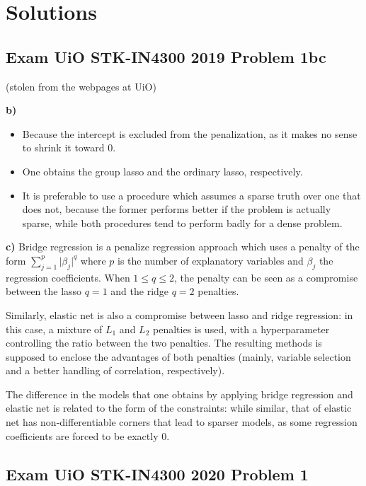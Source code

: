 \documentclass[
  letterpaper,
  DIV=11,
  numbers=noendperiod]{scrartcl}
\providecommand{\tightlist}{%
  \setlength{\itemsep}{0pt}\setlength{\parskip}{0pt}}\usepackage{longtable,booktabs,array}
\begin{document}
\hypertarget{solutions}{%
\section{Solutions}\label{solutions}}

\hypertarget{exam-uio-stk-in4300-2019-problem-1bc}{%
\subsection{Exam UiO STK-IN4300 2019 Problem
1bc}\label{exam-uio-stk-in4300-2019-problem-1bc}}

(stolen from the webpages at UiO)

\textbf{b)}

\begin{itemize}
\tightlist
\item
  Because the intercept is excluded from the penalization, as it makes
  no sense to shrink it toward 0.
\item
  One obtains the group lasso and the ordinary lasso, respectively.
\item
  It is preferable to use a procedure which assumes a sparse truth over
  one that does not, because the former performs better if the problem
  is actually sparse, while both procedures tend to perform badly for a
  dense problem.
\end{itemize}

\textbf{c)} Bridge regression is a penalize regression approach which
uses a penalty of the form \(\sum_{j=1}^p \lvert \beta_j\rvert^q\) where
\(p\) is the number of explanatory variables and \(\beta_j\) the
regression coeﬃcients. When \(1 \le q \le 2\), the penalty can be seen
as a compromise between the lasso \(q=1\) and the ridge \(q=2\)
penalties.

Similarly, elastic net is also a compromise between lasso and ridge
regression: in this case, a mixture of \(L_1\) and \(L_2\) penalties is
used, with a hyperparameter controlling the ratio between the two
penalties. The resulting methods is supposed to enclose the advantages
of both penalties (mainly, variable selection and a better handling of
correlation, respectively).

The difference in the models that one obtains by applying bridge
regression and elastic net is related to the form of the constraints:
while similar, that of elastic net has non-differentiable corners that
lead to sparser models, as some regression coeﬃcients are forced to be
exactly 0.

\hypertarget{exam-uio-stk-in4300-2020-problem-1}{%
\subsection{Exam UiO STK-IN4300 2020 Problem
1}\label{exam-uio-stk-in4300-2020-problem-1}}
\end{document}
